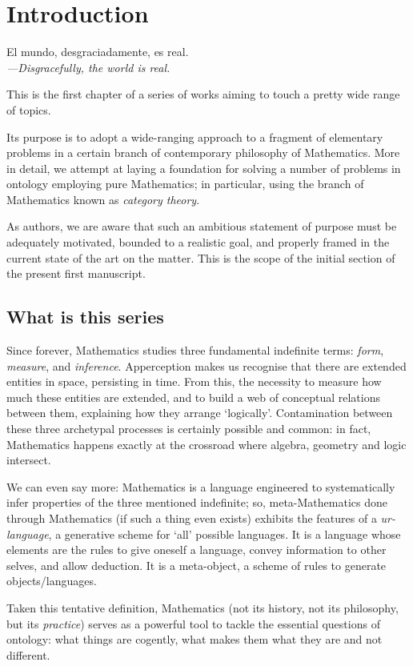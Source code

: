 \section{Introduction}\label{sec_intro}
\epigraph{El mundo, desgraciadamente, es real.\\[2mm]
\footnotesize\emph{---Disgracefully, the world is real.}
}{\cite{confutacion}}
This is the first chapter of a series of works aiming to touch a pretty wide range of topics.

Its purpose is to adopt a wide-ranging approach to a fragment of elementary problems in a certain branch of contemporary philosophy of Mathematics. More in detail, we attempt at laying a foundation for solving a number of problems in ontology employing pure Mathematics; in particular, using the branch of Mathematics known as \emph{category theory}.

As authors, we are aware that such an ambitious statement of purpose must be adequately motivated, bounded to a realistic goal, and properly framed in the current state of the art on the matter. This is the scope of the initial section of the present first manuscript.
\subsection{What is this series}
Since forever, Mathematics studies three fundamental indefinite terms: \emph{form}, \emph{measure}, and \emph{inference}. Apperception makes us recognise that there are extended entities in space, persisting in time. From this, the necessity to measure how much these entities are extended, and to build a web of conceptual relations between them, explaining how they arrange `logically'.
Contamination between these three archetypal processes is certainly possible and common: in fact, Mathematics happens exactly at the crossroad where algebra, geometry and logic intersect.

We can even say more: Mathematics is a language engineered to systematically infer properties of the three mentioned indefinite; so, meta\hyp{}Mathematics done through Mathematics (if such a thing even exists) exhibits the features of a \emph{ur-language}, a generative scheme for `all' possible languages. It is a language whose elements are the rules to give oneself a language, convey information to other selves, and allow deduction. It is a meta-object, a scheme of rules to generate objects/languages.

Taken this tentative definition, Mathematics (not its history, not its philosophy, but its \emph{practice}) serves as a powerful tool to tackle the essential questions of ontology: what things are cogently, what makes them what they are and not different.

